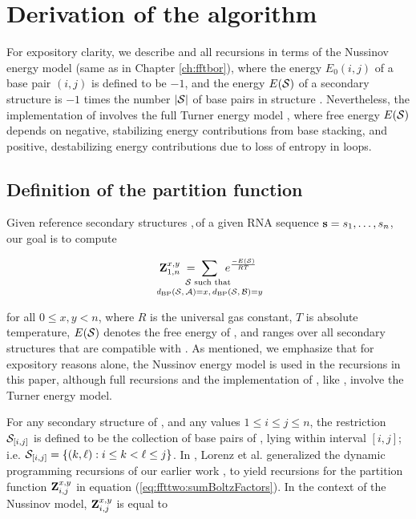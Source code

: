 
\section{Derivation of the \ffttwo algorithm}
\label{sec:ffttwo:math}

For expository clarity, we describe \ffttwo and all recursions
in terms of the Nussinov energy model \cite{nussinovJacobson}
(same as in Chapter \ref{ch:fftbor}), where
the energy $E_0(i,j)$ of a base pair $(i,j)$ is defined to be $-1$, and the
energy $E(\mathcal S)$ of a secondary structure \str is $-1$ times the number $|\mathcal S|$
of base pairs in structure \str.  Nevertheless, the implementation of
\ffttwo involves the full Turner energy model \cite{xia:RNA}, where
free energy $E(\mathcal S)$ depends on negative, stabilizing energy contributions
from base stacking, and positive, destabilizing energy contributions due to
loss of entropy in loops.

\subsection{Definition of the partition function
\texorpdfstring{}{}}
\label{subsec:ffttwo:recursions}

Given reference secondary structures \strA,\,\strB of a
given RNA sequence ${\bf s}=s_1,\dots,s_n$, our goal is to compute

\begin{align}
\label{eq:ffttwo:sumBoltzFactors}
\bfZ{x,y}{1,n}\;=\;
\sum_{\mathclap{\substack{
\str \text{ such that } \rule[-.5ex]{0pt}{0pt} \\
\dBP{\str}{\strA} = x,\,\dBP{\str}{\strB} = y}}}\enspace
\boltzF{\str}
\end{align}

for all $0 \leq x,y < n$, where $R$ is the universal gas constant, $T$
is absolute temperature, $E(\mathcal S)$ denotes the free energy of \str,
and \str ranges
over all secondary structures that are compatible with \seq. As mentioned,
we emphasize that for expository reasons alone, the Nussinov energy model is
used in the recursions in this paper, although full recursions and
the implementation of \ffttwo, like \fftbor, involve the Turner energy model.

For any secondary structure \str of \seq, and any values
$1 \leq i \leq j \leq n$, the restriction $\mathcal S_{[i,j]}$ is defined to be the
collection of base pairs of \str, lying within interval $[i,j]$; i.e.
$\mathcal S_{[i,j]} = \{ (k, \ell) : i \leq k < \ell \leq j \}$.
In \cite{hofacker:RNAbor2D}, Lorenz et al. generalized
the dynamic programming recursions of our earlier work \cite{Freyhult.b07},
to yield recursions
for the partition function ${\bf Z}^{x,y}_{i,j}$ in equation
(\ref{eq:ffttwo:sumBoltzFactors}). In the context of the Nussinov model,
${\bf Z}^{x,y}_{i,j}$ is equal to

